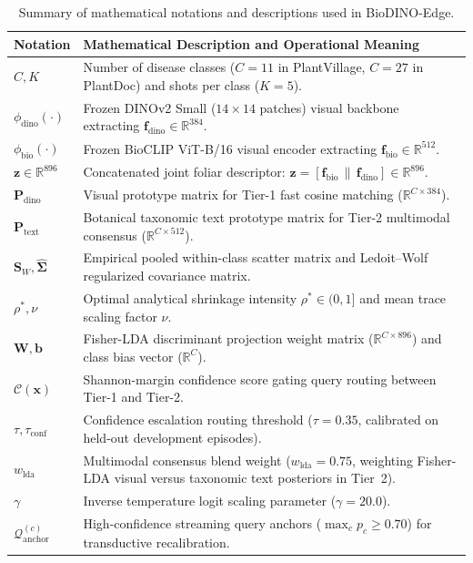\documentclass[preprint,12pt]{elsarticle}
\begin{document}
\begin{table}[htbp]
\caption{Summary of mathematical notations and descriptions used in BioDINO-Edge.}
\label{tab:notation}
\centering

\footnotesize
\begin{tabularx}{\textwidth}{lX}
\toprule
\textbf{Notation} & \textbf{Mathematical Description and Operational Meaning} \\
\midrule
$C, K$ & Number of disease classes ($C=11$ in PlantVillage, $C=27$ in PlantDoc) and shots per class ($K=5$). \\
$\phi_{\text{dino}}(\cdot)$ & Frozen DINOv2 Small ($14\times 14$ patches) visual backbone extracting $\mathbf{f}_{\text{dino}} \in \mathbb{R}^{384}$. \\
$\phi_{\text{bio}}(\cdot)$ & Frozen BioCLIP ViT-B/16 visual encoder extracting $\mathbf{f}_{\text{bio}} \in \mathbb{R}^{512}$. \\
$\mathbf{z} \in \mathbb{R}^{896}$ & Concatenated joint foliar descriptor: $\mathbf{z} = [\mathbf{f}_{\text{bio}} \,\|\, \mathbf{f}_{\text{dino}}] \in \mathbb{R}^{896}$. \\
$\mathbf{P}_{\text{dino}}$ & Visual prototype matrix for Tier-1 fast cosine matching ($\mathbb{R}^{C \times 384}$). \\
$\mathbf{P}_{\text{text}}$ & Botanical taxonomic text prototype matrix for Tier-2 multimodal consensus ($\mathbb{R}^{C \times 512}$). \\
$\mathbf{S}_W, \hat{\mathbf{\Sigma}}$ & Empirical pooled within-class scatter matrix and Ledoit--Wolf regularized covariance matrix. \\
$\rho^*, \nu$ & Optimal analytical shrinkage intensity $\rho^* \in (0, 1]$ and mean trace scaling factor $\nu$. \\
$\mathbf{W}, \mathbf{b}$ & Fisher-LDA discriminant projection weight matrix ($\mathbb{R}^{C \times 896}$) and class bias vector ($\mathbb{R}^C$). \\
$\mathcal{C}(\mathbf{x})$ & Shannon-margin confidence score gating query routing between Tier-1 and Tier-2. \\
$\tau, \tau_{\text{conf}}$ & Confidence escalation routing threshold ($\tau = 0.35$, calibrated on held-out development episodes). \\
$w_{\text{lda}}$ & Multimodal consensus blend weight ($w_{\text{lda}} = 0.75$, weighting Fisher-LDA visual versus taxonomic text posteriors in Tier~2). \\
$\gamma$ & Inverse temperature logit scaling parameter ($\gamma = 20.0$). \\
$\mathcal{Q}_{\text{anchor}}^{(c)}$ & High-confidence streaming query anchors ($\max_c p_c \ge 0.70$) for transductive recalibration. \\
\bottomrule
\end{tabularx}
\end{table}
\end{document}
